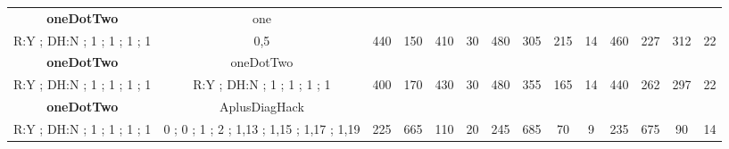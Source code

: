 \begin{table}[]
{\begin{tabular}{|c|c|c|c|c|c|c|c|c|c|c|c|c|c|}
\cellcolor{blue!15}\textbf{oneDotTwo} & one& {\color[HTML]{00009B} } & {\color[HTML]{9A0000} } & {\color[HTML]{009901} } &  & {\color[HTML]{00009B} } & {\color[HTML]{9A0000} } & {\color[HTML]{009901} } &  & {\color[HTML]{00009B} } & {\color[HTML]{9A0000} } & {\color[HTML]{009901} } &  \\ 
\cellcolor{ blue!15}R:Y ; DH:N ; 1 ; 1 ; 1 ; 1 & 0,5 & \multirow{-2}{*}{{\color[HTML]{00009B} 440}} & \multirow{-2}{*}{{\color[HTML]{9A0000} 150}} & \multirow{-2}{*}{{\color[HTML]{009901} 410}} & \multirow{-2}{*}{30} & \multirow{-2}{*}{{\color[HTML]{00009B} 480}} & \multirow{-2}{*}{{\color[HTML]{9A0000} 305}} & \multirow{-2}{*}{{\color[HTML]{009901} 215}} & \multirow{-2}{*}{14} & \multirow{-2}{*}{{\color[HTML]{00009B} 460}} & \multirow{-2}{*}{{\color[HTML]{9A0000} 227}} & \multirow{-2}{*}{{\color[HTML]{009901} 312}} & \multirow{-2}{*}{22} \\ \hline

\cellcolor{blue!15}\textbf{oneDotTwo} & oneDotTwo& {\color[HTML]{00009B} } & {\color[HTML]{9A0000} } & {\color[HTML]{009901} } &  & {\color[HTML]{00009B} } & {\color[HTML]{9A0000} } & {\color[HTML]{009901} } &  & {\color[HTML]{00009B} } & {\color[HTML]{9A0000} } & {\color[HTML]{009901} } &  \\ 
\cellcolor{ blue!15}R:Y ; DH:N ; 1 ; 1 ; 1 ; 1 & R:Y ; DH:N ; 1 ; 1 ; 1 ; 1 & \multirow{-2}{*}{{\color[HTML]{00009B} 400}} & \multirow{-2}{*}{{\color[HTML]{9A0000} 170}} & \multirow{-2}{*}{{\color[HTML]{009901} 430}} & \multirow{-2}{*}{30} & \multirow{-2}{*}{{\color[HTML]{00009B} 480}} & \multirow{-2}{*}{{\color[HTML]{9A0000} 355}} & \multirow{-2}{*}{{\color[HTML]{009901} 165}} & \multirow{-2}{*}{14} & \multirow{-2}{*}{{\color[HTML]{00009B} 440}} & \multirow{-2}{*}{{\color[HTML]{9A0000} 262}} & \multirow{-2}{*}{{\color[HTML]{009901} 297}} & \multirow{-2}{*}{22} \\ \hline

\cellcolor{blue!15}\textbf{oneDotTwo} & AplusDiagHack& {\color[HTML]{00009B} } & {\color[HTML]{9A0000} } & {\color[HTML]{009901} } &  & {\color[HTML]{00009B} } & {\color[HTML]{9A0000} } & {\color[HTML]{009901} } &  & {\color[HTML]{00009B} } & {\color[HTML]{9A0000} } & {\color[HTML]{009901} } &  \\ 
\cellcolor{ blue!15}R:Y ; DH:N ; 1 ; 1 ; 1 ; 1 & 0 ; 0 ; 1 ; 2 ; 1,13 ; 1,15 ; 1,17 ; 1,19 & \multirow{-2}{*}{{\color[HTML]{00009B} 225}} & \multirow{-2}{*}{{\color[HTML]{9A0000} 665}} & \multirow{-2}{*}{{\color[HTML]{009901} 110}} & \multirow{-2}{*}{20} & \multirow{-2}{*}{{\color[HTML]{00009B} 245}} & \multirow{-2}{*}{{\color[HTML]{9A0000} 685}} & \multirow{-2}{*}{{\color[HTML]{009901} 70}} & \multirow{-2}{*}{9} & \multirow{-2}{*}{{\color[HTML]{00009B} 235}} & \multirow{-2}{*}{{\color[HTML]{9A0000} 675}} & \multirow{-2}{*}{{\color[HTML]{009901} 90}} & \multirow{-2}{*}{14} \\ \hline


\end{tabular}}
\end{table}
